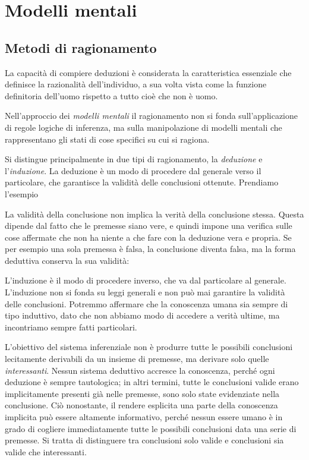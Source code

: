\chapter{Modelli mentali}
\section{Metodi di ragionamento}
La capacità di compiere deduzioni è considerata la caratteristica essenziale che definisce la razionalità dell’individuo, a sua volta vista come la funzione definitoria dell’uomo rispetto a tutto cioè che non è uomo.

Nell’approccio dei \emph{modelli mentali} il ragionamento non si fonda sull’applicazione di regole logiche di inferenza, ma sulla manipolazione di modelli mentali che rappresentano gli stati di cose specifici su cui si ragiona.

Si distingue principalmente in due tipi di ragionamento, la \emph{deduzione} e l’\emph{induzione}. La deduzione è un modo di procedere dal generale verso il particolare, che garantisce la validità delle conclusioni ottenute. Prendiamo l’esempio

	
La validità della conclusione non implica la verità della conclusione stessa. Questa dipende dal fatto che le premesse siano vere, e quindi impone una verifica sulle cose affermate che non ha niente a che fare con la deduzione vera e propria. Se per esempio una sola premessa è falsa, la conclusione diventa falsa, ma la forma deduttiva conserva la sua validità:


L’induzione è il modo di procedere inverso, che va dal particolare al generale. L’induzione non si fonda su leggi generali e non può mai garantire la validità delle conclusioni. Potremmo affermare che la conoscenza umana sia sempre di tipo induttivo, dato che non abbiamo modo di accedere a verità ultime, ma incontriamo sempre fatti particolari.

L’obiettivo del sistema inferenziale non è produrre tutte le possibili conclusioni lecitamente derivabili da un insieme di premesse, ma derivare solo quelle \emph{interessanti}. Nessun sistema deduttivo accresce la conoscenza, perché ogni deduzione è sempre tautologica; in altri termini, tutte le conclusioni valide erano implicitamente presenti già nelle premesse, sono solo state evidenziate nella conclusione. Ciò nonostante, il rendere esplicita una parte della conoscenza implicita può essere altamente informativo, perché nessun essere umano è in grado di cogliere immediatamente tutte le possibili conclusioni data una serie di premesse. Si tratta di distinguere tra conclusioni solo valide e conclusioni sia valide che interessanti.

